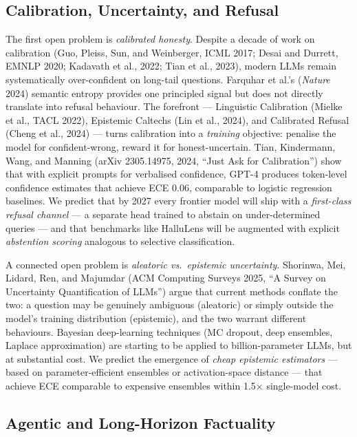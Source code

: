 \subsection{Calibration, Uncertainty, and Refusal}\label{calibration-uncertainty-and-refusal}

The first open problem is \emph{calibrated honesty}. Despite a decade of work on calibration (Guo, Pleiss, Sun, and Weinberger, ICML 2017; Desai and Durrett, EMNLP 2020; Kadavath et al., 2022; Tian et al., 2023), modern LLMs remain systematically over-confident on long-tail questions. Farquhar et al.'s (\emph{Nature} 2024) semantic entropy provides one principled signal but does not directly translate into refusal behaviour. The forefront --- Linguistic Calibration (Mielke et al., TACL 2022), Epistemic Caltechs (Lin et al., 2024), and Calibrated Refusal (Cheng et al., 2024) --- turns calibration into a \emph{training} objective: penalise the model for confident-wrong, reward it for honest-uncertain. Tian, Kindermann, Wang, and Manning (arXiv 2305.14975, 2024, ``Just Ask for Calibration'') show that with explicit prompts for verbalised confidence, GPT-4 produces token-level confidence estimates that achieve ECE 0.06, comparable to logistic regression baselines. We predict that by 2027 every frontier model will ship with a \emph{first-class refusal channel} --- a separate head trained to abstain on under-determined queries --- and that benchmarks like HalluLens will be augmented with explicit \emph{abstention scoring} analogous to selective classification.

A connected open problem is \emph{aleatoric vs.~epistemic uncertainty}. Shorinwa, Mei, Lidard, Ren, and Majumdar (ACM Computing Surveys 2025, ``A Survey on Uncertainty Quantification of LLMs'') argue that current methods conflate the two: a question may be genuinely ambiguous (aleatoric) or simply outside the model's training distribution (epistemic), and the two warrant different behaviours. Bayesian deep-learning techniques (MC dropout, deep ensembles, Laplace approximation) are starting to be applied to billion-parameter LLMs, but at substantial cost. We predict the emergence of \emph{cheap epistemic estimators} --- based on parameter-efficient ensembles or activation-space distance --- that achieve ECE comparable to expensive ensembles within 1.5× single-model cost.

\subsection{Agentic and Long-Horizon Factuality}\label{agentic-and-long-horizon-factuality}

